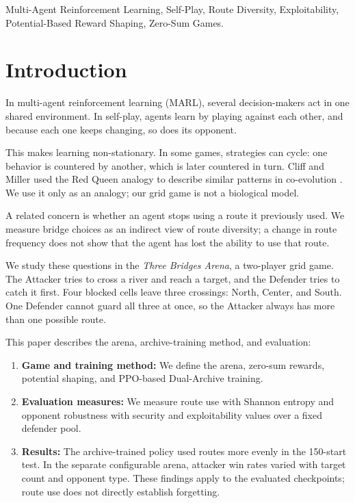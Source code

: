 \documentclass[conference]{IEEEtran}
\begin{document}
\begin{IEEEkeywords}
Multi-Agent Reinforcement Learning, Self-Play, Route Diversity, Exploitability, Potential-Based Reward Shaping, Zero-Sum Games.
\end{IEEEkeywords}

\section{Introduction}
In multi-agent reinforcement learning (MARL), several decision-makers act in one shared environment. In self-play, agents learn by playing against each other, and because each one keeps changing, so does its opponent.

This makes learning non-stationary. In some games, strategies can cycle: one behavior is countered by another, which is later countered in turn. Cliff and Miller used the Red Queen analogy to describe similar patterns in co-evolution \cite{cliff1995tracking}. We use it only as an analogy; our grid game is not a biological model.

A related concern is whether an agent stops using a route it previously used. We measure bridge choices as an indirect view of route diversity; a change in route frequency does not show that the agent has lost the ability to use that route.

We study these questions in the \textit{Three Bridges Arena}, a two-player grid game. The Attacker tries to cross a river and reach a target, and the Defender tries to catch it first. Four blocked cells leave three crossings: North, Center, and South. One Defender cannot guard all three at once, so the Attacker always has more than one possible route.

This paper describes the arena, archive-training method, and evaluation:
\begin{enumerate}
    \item \textbf{Game and training method:} We define the arena, zero-sum rewards, potential shaping, and PPO-based Dual-Archive training.
    \item \textbf{Evaluation measures:} We measure route use with Shannon entropy and opponent robustness with security and exploitability values over a fixed defender pool.
    \item \textbf{Results:} The archive-trained policy used routes more evenly in the 150-start test. In the separate configurable arena, attacker win rates varied with target count and opponent type. These findings apply to the evaluated checkpoints; route use does not directly establish forgetting.
\end{enumerate}
\end{document}
